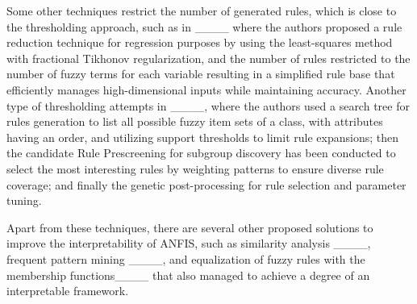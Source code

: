 Some other techniques restrict the number of generated rules, which is close to the thresholding approach, such as in  ____ where the authors proposed a rule reduction technique for regression purposes by using the least-squares method with fractional Tikhonov regularization, and the number of rules restricted to the number of fuzzy terms for each variable resulting in a simplified rule base that efficiently manages high-dimensional inputs while maintaining accuracy.
Another type of thresholding attempts in ____, where the authors used a search tree for rules generation to list all possible fuzzy item sets of a class, with attributes having an order, and utilizing support thresholds to limit rule expansions; then the candidate Rule Prescreening for subgroup discovery has been conducted to select the most interesting rules by weighting patterns to ensure diverse rule coverage; and finally the genetic post-processing for rule selection and parameter tuning. 

Apart from these techniques, there are several other proposed solutions to improve the interpretability of ANFIS, such as similarity analysis ____, frequent pattern mining ____, and equalization of fuzzy rules with the membership functions____ that also managed to achieve a degree of an interpretable framework.

